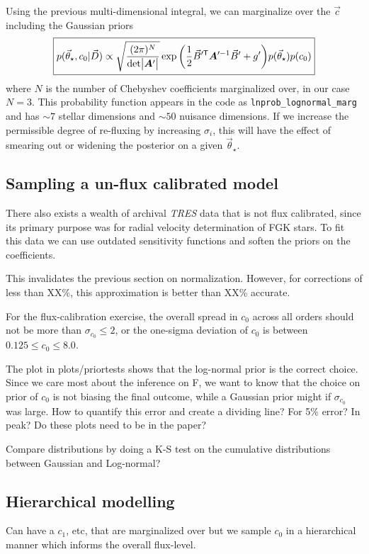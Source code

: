 \documentclass[preprint]{aastex} %
\newcommand{\vt}{\vec{\theta}}
\newcommand{\vstar}{\vt_{\star}}
\newcommand{\vc}{\vec{c}}
\newcommand{\vD}{\vec{D}}
\newcommand{\trans}{\mathsf{T}}
\begin{document}
Using the previous multi-dimensional integral, we can marginalize over the $\vc$ including the Gaussian priors
\begin{equation}
  \boxed{
  p(\vstar, c_0 | \vD) \propto \sqrt{\frac{(2 \pi )^N}{ {\rm det} \bigl |{\bm A}^\prime \bigr |}} \exp{ \left ( \frac{1}{2} \vec{B}^{\prime\trans} {\bm A}^{\prime -1} \vec{B}^\prime + g^\prime \right )} p(\vstar) p(c_0)
}
\end{equation}
where $N$ is the number of Chebyshev coefficients marginalized over, in our case $N=3$. This probability function appears in the code as \texttt{lnprob\_lognormal\_marg} and has $\sim 7$ stellar dimensions and $\sim 50$ nuisance dimensions. If we increase the permissible degree of re-fluxing by increasing $\sigma_i$, this will have the effect of smearing out or widening the posterior on a given $\vstar$.


\subsection{Sampling a un-flux calibrated model}
There also exists a wealth of archival \emph{TRES} data that is not flux calibrated, since its primary purpose was for radial velocity determination of FGK stars. To fit this data we can use outdated sensitivity functions and soften the priors on the coefficients.

This invalidates the previous section on normalization. However, for corrections of less than XX\%, this approximation is better than XX\% accurate.

For the flux-calibration exercise, the overall spread in $c_0$ across all orders should not be more than $\sigma_{c_0} \leq 2$, or the one-sigma deviation of $c_0$ is between $0.125 \leq c_0 \leq 8.0$.

The plot in plots/priortests shows that the log-normal prior is the correct choice. Since we care most about the inference on F, we want to know that the choice on prior of $c_0$ is not biasing the final outcome, while a Gaussian prior might if $\sigma_{c_0}$ was large. How to quantify this error and create a dividing line? For 5\% error? In peak? Do these plots need to be in the paper?
 
Compare distributions by doing a K-S test on the cumulative distributions between Gaussian and Log-normal?

\subsection{Hierarchical modelling}
Can have a $c_1$, etc, that are marginalized over but we sample $c_0$ in a hierarchical manner which informs the overall flux-level.
\end{document}
